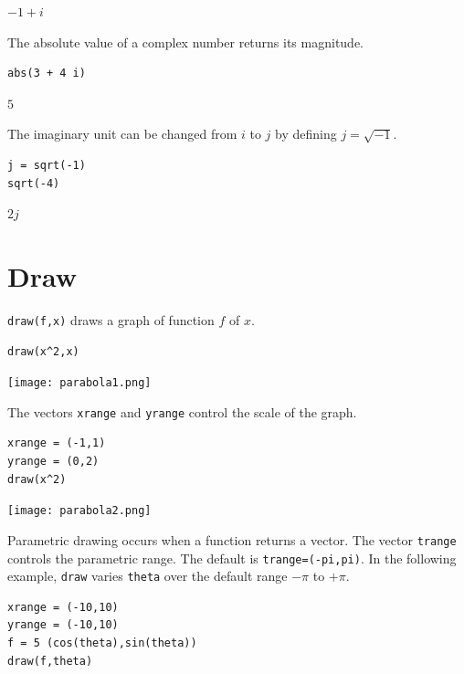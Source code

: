 \documentclass[12pt]{article}
\begin{document}
$\displaystyle -1+i$

\bigskip

The absolute value of a complex number returns its magnitude.

{\color{blue}
\begin{verbatim}
abs(3 + 4 i)
\end{verbatim}
}

$\displaystyle 5$

\bigskip

The imaginary unit can be changed from $i$ to $j$
by defining $j=\sqrt{-1}$.

{\color{blue}
\begin{verbatim}
j = sqrt(-1)
sqrt(-4)
\end{verbatim}
}

$\displaystyle 2j$

\newpage

\section{Draw}

\verb$draw(f,x)$ draws a graph of function $f$ of $x$.

{\color{blue}
\begin{verbatim}
draw(x^2,x)
\end{verbatim}}

\begin{center}
\texttt{[image: parabola1.png]}
\end{center}

The vectors \verb$xrange$ and \verb$yrange$ control the scale of the graph.

{\color{blue}
\begin{verbatim}
xrange = (-1,1)
yrange = (0,2)
draw(x^2)
\end{verbatim}}

\begin{center}
\texttt{[image: parabola2.png]}
\end{center}

Parametric drawing occurs when a function returns a vector.
The vector \verb$trange$ controls the parametric range.
The default is \verb$trange=(-pi,pi)$.
In the following example, \verb$draw$ varies \verb$theta$
over the default range $-\pi$ to $+\pi$.

{\color{blue}
\begin{verbatim}
xrange = (-10,10)
yrange = (-10,10)
f = 5 (cos(theta),sin(theta))
draw(f,theta)
\end{verbatim}}
\end{document}
